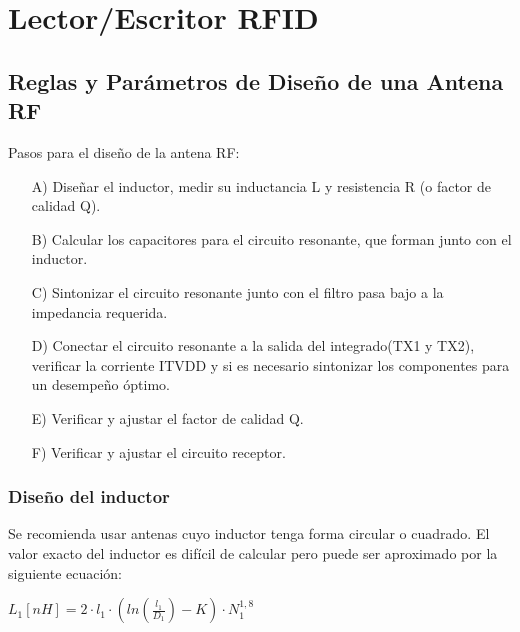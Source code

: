 \chapter{Lector/Escritor RFID}

\section{Reglas y Parámetros de Diseño de una Antena RF}

Pasos para el diseño de la antena RF:

\begin{itemize}
\item[A)] Diseñar el inductor, medir su inductancia L y resistencia R (o factor de calidad Q).
\item[B)] Calcular los capacitores para el circuito resonante, que forman junto con el inductor.
\item[C)] Sintonizar el circuito resonante junto con el filtro pasa bajo a la impedancia requerida.
\item[D)] Conectar el circuito resonante a la salida del integrado(TX1 y TX2), verificar la corriente ITVDD y si es necesario sintonizar los componentes para un desempeño óptimo.
\item[E)] Verificar y ajustar el factor de calidad Q.
\item[F)] Verificar y ajustar el circuito receptor.
\end{itemize}

\subsection{Diseño del inductor}

Se recomienda usar antenas cuyo inductor tenga forma circular o cuadrado. El valor exacto del inductor es difícil de calcular pero puede ser aproximado por la siguiente ecuación:

\centerline{$ L_{1}[nH]=2 \cdot l_{1} \cdot (ln(\frac{l_{1}}{D_{1}})-K) \cdot N^{1,8}_1$}

	




